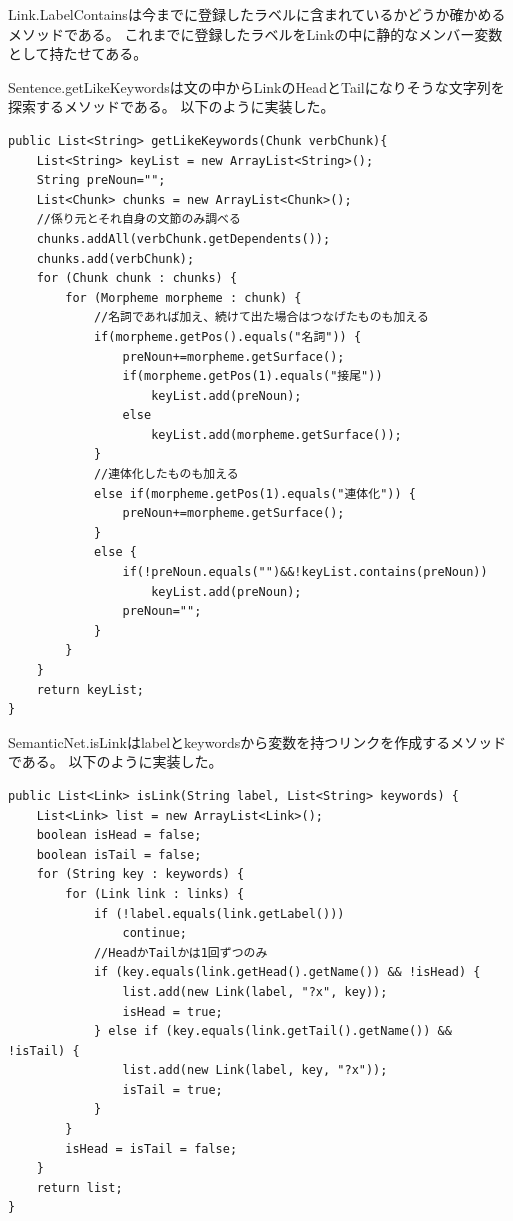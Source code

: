 \documentclass{jarticle}
\begin{document}
Link.LabelContainsは今までに登録したラベルに含まれているかどうか確かめるメソッドである。
これまでに登録したラベルをLinkの中に静的なメンバー変数として持たせてある。


Sentence.getLikeKeywordsは文の中からLinkのHeadとTailになりそうな文字列を探索するメソッドである。
以下のように実装した。

\begin{lstlisting}[caption=Link.LabelContains,label=LabelContains]
public List<String> getLikeKeywords(Chunk verbChunk){
    List<String> keyList = new ArrayList<String>();
    String preNoun="";
    List<Chunk> chunks = new ArrayList<Chunk>();
    //係り元とそれ自身の文節のみ調べる
    chunks.addAll(verbChunk.getDependents());
    chunks.add(verbChunk);
    for (Chunk chunk : chunks) {
        for (Morpheme morpheme : chunk) {
            //名詞であれば加え、続けて出た場合はつなげたものも加える
            if(morpheme.getPos().equals("名詞")) {
                preNoun+=morpheme.getSurface();
                if(morpheme.getPos(1).equals("接尾"))
                    keyList.add(preNoun);
                else
                    keyList.add(morpheme.getSurface());
            }
            //連体化したものも加える
            else if(morpheme.getPos(1).equals("連体化")) {
                preNoun+=morpheme.getSurface();
            }
            else {
                if(!preNoun.equals("")&&!keyList.contains(preNoun))
                    keyList.add(preNoun);
                preNoun="";
            }
        }
    }
    return keyList;
}
\end{lstlisting}

SemanticNet.isLinkはlabelとkeywordsから変数を持つリンクを作成するメソッドである。
以下のように実装した。

\begin{lstlisting}[caption=SemanticNet.isLink,label=isLink]
public List<Link> isLink(String label, List<String> keywords) {
    List<Link> list = new ArrayList<Link>();
    boolean isHead = false;
    boolean isTail = false;
    for (String key : keywords) {
        for (Link link : links) {
            if (!label.equals(link.getLabel()))
                continue;
            //HeadかTailかは1回ずつのみ
            if (key.equals(link.getHead().getName()) && !isHead) {
                list.add(new Link(label, "?x", key));
                isHead = true;
            } else if (key.equals(link.getTail().getName()) && !isTail) {
                list.add(new Link(label, key, "?x"));
                isTail = true;
            }
        }
        isHead = isTail = false;
    }
    return list;
}
\end{lstlisting}
\end{document}
